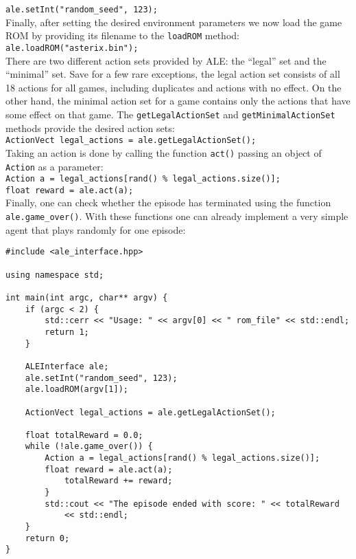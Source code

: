 \documentclass[12pt]{article}
\begin{document}
\verb+ale.setInt("random_seed", 123);+\\

Finally, after setting the desired environment parameters we now load the game ROM by providing its filename to the \verb+loadROM+ method:\\

\verb+ale.loadROM("asterix.bin");+\\

There are two different action sets provided by ALE: the ``legal'' set and the ``minimal'' 
set. Save for a few rare exceptions, the legal action set consists of all 18 actions for all games, including duplicates and actions with no effect. On the other hand, the minimal action set for a game contains only 
the actions that have some effect on that game. The \verb+getLegalActionSet+ and \verb+getMinimalActionSet+ methods provide the desired action sets:\\ 

\verb+ActionVect legal_actions = ale.getLegalActionSet();+\\

Taking an action is done by calling the function \verb+act()+ passing an object of \verb+Action+ as a parameter:\\

\verb+Action a = legal_actions[rand() % legal_actions.size()];+\\
\indent \verb+float reward = ale.act(a);+\\

Finally, one can check whether the episode has terminated using the function \verb+ale.game_over()+. With these 
functions one can already implement a very simple agent that plays randomly for one episode:

\begin{verbatim}
#include <ale_interface.hpp>

using namespace std;

int main(int argc, char** argv) {
    if (argc < 2) {
        std::cerr << "Usage: " << argv[0] << " rom_file" << std::endl;
        return 1;
    }

    ALEInterface ale;
    ale.setInt("random_seed", 123);
    ale.loadROM(argv[1]);

    ActionVect legal_actions = ale.getLegalActionSet();
    
    float totalReward = 0.0;
    while (!ale.game_over()) {
        Action a = legal_actions[rand() % legal_actions.size()];    
        float reward = ale.act(a);
            totalReward += reward;
        }
        std::cout << "The episode ended with score: " << totalReward 
            << std::endl;
    }
    return 0;
}
\end{verbatim}
\end{document}
